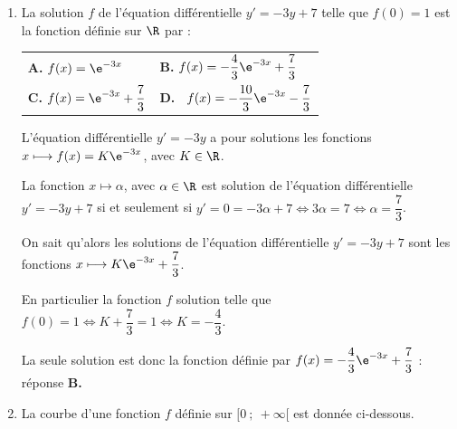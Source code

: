 
\medskip

%

\begin{enumerate}
\item La solution $f$ de l'équation différentielle $y'=-3y + 7$ telle que $f(0) = 1$ est la fonction définie sur $\R$ par :

\smallskip

\begin{center}
\renewcommand\arraystretch{1.9}
\begin{tabularx}{\linewidth}{X X}
\textbf{A. } $f(x) = \e^{-3x}$&\textbf{B. } $f(x) = - \dfrac43 \e^{-3x} + \dfrac73$\\
\textbf{C. } $f(x) = \e^{-3x} + \dfrac73$&\textbf{D.~} $f(x) = - \dfrac{10}{3} \e^{-3x} - \dfrac73$
\end{tabularx}
\end{center}

L'équation différentielle $y' = - 3y$ a pour solutions les fonctions $x \longmapsto f(x) = K \e^{- 3x}$, avec $K \in \R$.

La fonction $x \longmapsto \alpha$, avec $\alpha \in \R$ est solution de l'équation différentielle $y' = - 3y + 7$ si et seulement si $y' = 0 = - 3\alpha + 7 \iff 3\alpha = 7 \iff \alpha = \dfrac73$.

On sait qu'alors les solutions de l'équation différentielle $y' = - 3y + 7$ sont les fonctions $x \longmapsto K \e^{- 3x} + \dfrac73$.

En particulier la fonction $f$ solution telle que $f(0) = 1 \iff K + \dfrac73 = 1 \iff K = - \dfrac43$.

La seule solution est donc la fonction définie par $f(x) = - \dfrac43\e^{-3x} + \dfrac73$ : réponse \textbf{B.}
\item La courbe d'une fonction $f$ définie sur $[0~;~+\infty[$ est donnée ci-dessous.
	

\end{enumerate}
